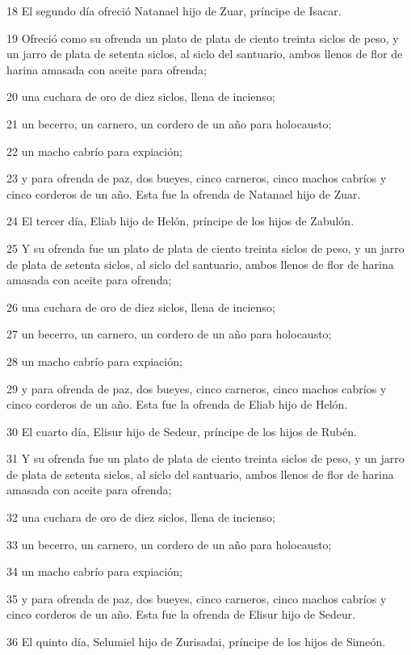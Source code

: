 \par 18 El segundo día ofreció Natanael hijo de Zuar, príncipe de Isacar.
\par 19 Ofreció como su ofrenda un plato de plata de ciento treinta siclos de peso,  y un jarro de plata de setenta siclos, al siclo del santuario, ambos llenos de flor de harina amasada con aceite para ofrenda;
\par 20 una cuchara de oro de diez siclos,  llena de incienso;
\par 21 un becerro, un carnero, un cordero de un año para holocausto;
\par 22 un macho cabrío para expiación;
\par 23 y para ofrenda de paz, dos bueyes, cinco carneros, cinco machos cabríos y cinco corderos de un año. Esta fue la ofrenda de Natanael hijo de Zuar.
\par 24 El tercer día, Eliab hijo de Helón, príncipe de los hijos de Zabulón.
\par 25 Y su ofrenda fue un plato de plata de ciento treinta siclos de peso,  y un jarro de plata de setenta siclos, al siclo del santuario, ambos llenos de flor de harina amasada con aceite para ofrenda;
\par 26 una cuchara de oro de diez siclos,  llena de incienso;
\par 27 un becerro, un carnero, un cordero de un año para holocausto;
\par 28 un macho cabrío para expiación; 
\par 29 y para ofrenda de paz, dos bueyes, cinco carneros, cinco machos cabríos y cinco corderos de un año. Esta fue la ofrenda de Eliab hijo de Helón.
\par 30 El cuarto día, Elisur hijo de Sedeur, príncipe de los hijos de Rubén.
\par 31 Y su ofrenda fue un plato de plata de ciento treinta siclos de peso,  y un jarro de plata de setenta siclos, al siclo del santuario, ambos llenos de flor de harina amasada con aceite para ofrenda;
\par 32 una cuchara de oro de diez siclos,  llena de incienso;
\par 33 un becerro, un carnero, un cordero de un año para holocausto;
\par 34 un macho cabrío para expiación;
\par 35 y para ofrenda de paz, dos bueyes, cinco carneros, cinco machos cabríos y cinco corderos de un año. Esta fue la ofrenda de Elisur hijo de Sedeur.
\par 36 El quinto día, Selumiel hijo de Zurisadai, príncipe de los hijos de Simeón.
